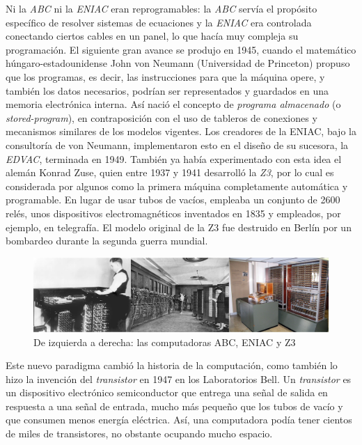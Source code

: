 \documentclass[
]{book}
\begin{document}
Ni la \emph{ABC} ni la \emph{ENIAC} eran reprogramables: la \emph{ABC} servía el propósito específico de resolver sistemas de ecuaciones y la \emph{ENIAC} era controlada conectando ciertos cables en un panel, lo que hacía muy compleja su programación. El siguiente gran avance se produjo en 1945, cuando el matemático húngaro-estadounidense John von Neumann (Universidad de Princeton) propuso que los programas, es decir, las instrucciones para que la máquina opere, y también los datos necesarios, podrían ser representados y guardados en una memoria electrónica interna. Así nació el concepto de \emph{programa almacenado} (o \emph{stored-program}), en contraposición con el uso de tableros de conexiones y mecanismos similares de los modelos vigentes. Los creadores de la ENIAC, bajo la consultoría de von Neumann, implementaron esto en el diseño de su sucesora, la \emph{EDVAC}, terminada en 1949.
También ya había experimentado con esta idea el alemán Konrad Zuse, quien entre 1937 y 1941 desarrolló la \emph{Z3}, por lo cual es considerada por algunos como la primera máquina completamente automática y programable. En lugar de usar tubos de vacíos, empleaba un conjunto de 2600 relés, unos dispositivos electromagnéticos inventados en 1835 y empleados, por ejemplo, en telegrafía.
El modelo original de la Z3 fue destruido en Berlín por un bombardeo durante la segunda guerra mundial.

\begin{figure}

{\centering \includegraphics[width=1\linewidth]{images/historia/berry_eniac_z3} 

}

\caption{De izquierda a derecha: las computadoras ABC, ENIAC y Z3}\label{fig:berry}
\end{figure}

Este nuevo paradigma cambió la historia de la computación, como también lo hizo la invención del \emph{transistor} en 1947 en los Laboratorios Bell. Un \emph{transistor} es un dispositivo electrónico semiconductor que entrega una señal de salida en respuesta a una señal de entrada, mucho más pequeño que los tubos de vacío y que consumen menos energía eléctrica. Así, una computadora podía tener cientos de miles de transistores, no obstante ocupando mucho espacio.
\end{document}
